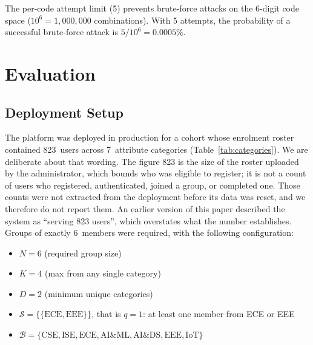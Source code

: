 \documentclass[11pt,a4paper]{article}
\theoremstyle{plain}
\theoremstyle{definition}
\theoremstyle{remark}
\begin{document}
The per-code attempt limit (5) prevents brute-force attacks on the 6-digit code space ($10^6 = 1{,}000{,}000$ combinations). With 5 attempts, the probability of a successful brute-force attack is $5/10^6 = 0.0005\%$.

\section{Evaluation}
\label{sec:evaluation}

\subsection{Deployment Setup}

The platform was deployed in production for a cohort whose enrolment roster contained 823~users across 7~attribute categories (Table~\ref{tab:categories}). We are deliberate about that wording. The figure 823 is the size of the roster uploaded by the administrator, which bounds who was eligible to register; it is not a count of users who registered, authenticated, joined a group, or completed one. Those counts were not extracted from the deployment before its data was reset, and we therefore do not report them. An earlier version of this paper described the system as ``serving 823 users'', which overstates what the number establishes. Groups of exactly 6~members were required, with the following configuration:
\begin{itemize}[noitemsep,topsep=3pt]
    \item $N = 6$ (required group size)
    \item $K = 4$ (max from any single category)
    \item $D = 2$ (minimum unique categories)
    \item $\mathcal{S} = \{\{\text{ECE}, \text{EEE}\}\}$, that is $q = 1$: at least one member from ECE or EEE
    \item $\mathcal{B} = \{\text{CSE}, \text{ISE}, \text{ECE}, \text{AI\&ML}, \text{AI\&DS}, \text{EEE}, \text{IoT}\}$
\end{itemize}
\end{document}
